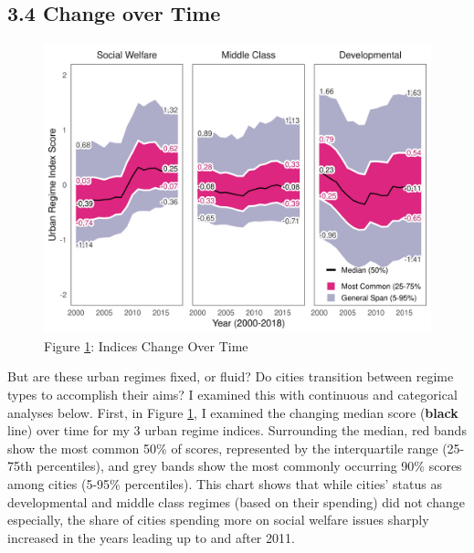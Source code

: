 \documentclass[preprint, 3p,
authoryear]{elsarticle} %
\begin{document}
\hypertarget{change-over-time}{%
\subsection{3.4 Change over Time}\label{change-over-time}}

\begin{figure}
\includegraphics[width=1\linewidth]{viz/bands} \caption{Figure \ref{fig:bands}\label{fig:bands}: Indices Change Over Time}\label{fig:bands}
\end{figure}

\doublespacing

But are these urban regimes fixed, or fluid? Do cities transition
between regime types to accomplish their aims? I examined this with
continuous and categorical analyses below. First, in Figure
\ref{fig:bands}, I examined the changing median score (\textbf{black}
line) over time for my 3 urban regime indices. Surrounding the median,
red bands show the most common 50\% of scores, represented by the
interquartile range (25-75th percentiles), and grey bands show the most
commonly occurring 90\% scores among cities (5-95\% percentiles). This
chart shows that while cities' status as developmental and middle class
regimes (based on their spending) did not change especially, the share
of cities spending more on social welfare issues sharply increased in
the years leading up to and after 2011.
\end{document}
